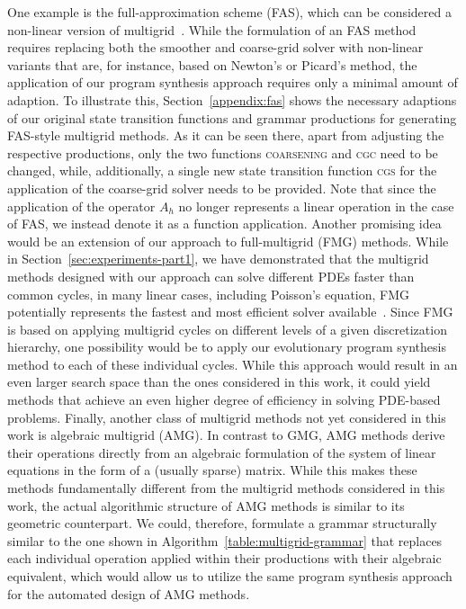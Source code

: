 One example is the full-approximation scheme (FAS), which can be considered a non-linear version of multigrid~\cite{trottenberg2000multigrid,briggs2000multigrid}.
While the formulation of an FAS method requires replacing both the smoother and coarse-grid solver with non-linear variants that are, for instance, based on Newton's or Picard's method, the application of our program synthesis approach requires only a minimal amount of adaption.
To illustrate this, Section~\ref{appendix:fas} shows the necessary adaptions of our original state transition functions and grammar productions for generating FAS-style multigrid methods. 
As it can be seen there, apart from adjusting the respective productions, only the two functions \textsc{coarsening} and \textsc{cgc} need to be changed, while, additionally, a single new state transition function \textsc{cgs} for the application of the coarse-grid solver needs to be provided. 
Note that since the application of the operator $A_h$ no longer represents a linear operation in the case of FAS, we instead denote it as a function application.
Another promising idea would be an extension of our approach to full-multigrid (FMG) methods.
While in Section~\ref{sec:experiments-part1}, we have demonstrated that the multigrid methods designed with our approach can solve different PDEs faster than common cycles, in many linear cases, including Poisson's equation, FMG potentially represents the fastest and most efficient solver available~\cite{trottenberg2000multigrid}.
Since FMG is based on applying multigrid cycles on different levels of a given discretization hierarchy, one possibility would be to apply our evolutionary program synthesis method to each of these individual cycles.
While this approach would result in an even larger search space than the ones considered in this work, it could yield methods that achieve an even higher degree of efficiency in solving PDE-based problems.
Finally, another class of multigrid methods not yet considered in this work is algebraic multigrid (AMG).
In contrast to GMG, AMG methods derive their operations directly from an algebraic formulation of the system of linear equations in the form of a (usually sparse) matrix.
While this makes these methods fundamentally different from the multigrid methods considered in this work, the actual algorithmic structure of AMG methods is similar to its geometric counterpart.
We could, therefore, formulate a grammar structurally similar to the one shown in Algorithm~\ref{table:multigrid-grammar} that replaces each individual operation applied within their productions with their algebraic equivalent, which would allow us to utilize the same program synthesis approach for the automated design of AMG methods.
